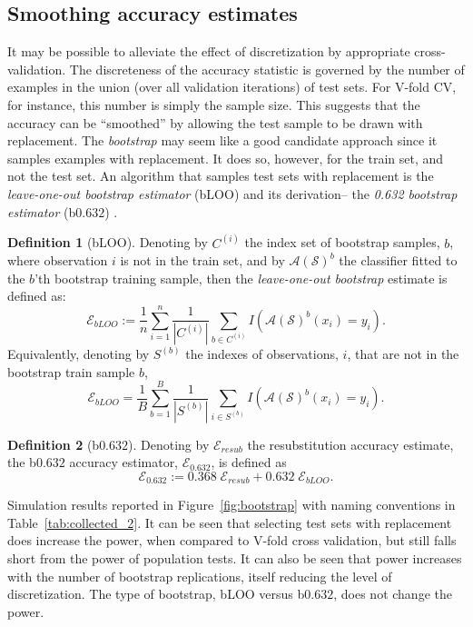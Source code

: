 \documentclass[12pt,a4paper]{article}
\theoremstyle{definition}
\newtheorem{definition}{Definition}
\newcommand{\acc}{\mathcal{E}}
\newcommand{\hyp}{\algo_\data} %
\newcommand{\hypEstim}{\algo(\data)} %
\newcommand{\algo}{\mathcal{A}}
\newcommand{\data}{\mathcal{S}}
\begin{document}
\subsection{Smoothing accuracy estimates}
\label{sec:bootstrap}
It may be possible to alleviate the effect of discretization by appropriate cross-validation. 
The discreteness of the accuracy statistic is governed by the number of examples in the union (over all validation iterations) of test sets.
For V-fold CV, for instance, this number is simply the sample size. 
This suggests that the accuracy can be ``smoothed'' by allowing the test sample to be drawn with replacement. 
The \emph{bootstrap} may seem like a good candidate approach since it samples examples with replacement. 
It does so, however, for the train set, and not the test set. 
An algorithm that samples test sets with replacement is the \emph{leave-one-out bootstrap estimator} (bLOO) and its derivation-- the \emph{0.632 bootstrap estimator} (b$0.632$) \citep[Sec 7.11]{hastie_elements_2003}.
\begin{definition}[bLOO]
\label{def:bloo}
Denoting by $C^{(i)}$ the index set of bootstrap samples, $b$, where observation $i$ is not in the train set,
and by $\hypEstim^b$ the classifier fitted to the $b$'th bootstrap training sample, 
then the \emph{leave-one-out bootstrap} estimate is defined as:
$$
	\acc_{bLOO}:= \frac 1n \sum_{i=1}^{n} \frac{1}{|C^{(i)}|} \sum_{b \in C^{(i)}} I(\hypEstim^b(x_i)=y_i).
$$ 
Equivalently, denoting by $S^{(b)}$ the indexes of observations, $i$, that are not in the bootstrap train sample $b$,
$$
	\acc_{bLOO}= \frac 1B \sum_{b=1}^{B} \frac{1}{|S^{(b)}|} \sum_{i \in S^{(b)}} I(\hypEstim^b(x_i)=y_i).
$$
\end{definition}

\begin{definition}[b$0.632$]
\label{def:b0632}
Denoting by $\acc_{resub}$ the resubstitution accuracy estimate, 
the b$0.632$ accuracy estimator, $\acc_{0.632}$, is defined as 
$$
	\acc_{0.632} := 0.368 \; \acc_{resub}  + 0.632 \; \acc_{bLOO}.
$$
\end{definition}

Simulation results reported in Figure~\ref{fig:bootstrap} with naming conventions in Table~\ref{tab:collected_2}.
It can be seen that selecting test sets with replacement does increase the power, when compared to V-fold cross validation, but still falls short from the power of population tests. 
It can also be seen that power increases with the number of bootstrap replications, itself reducing the level of discretization. 
The type of bootstrap, bLOO versus b$0.632$, does not change the power. 
\end{document}
